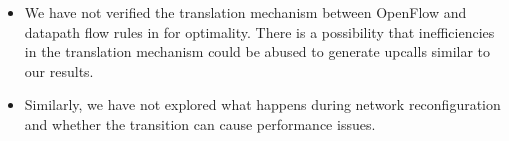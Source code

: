 \begin{itemize}
    \item We have not verified the translation mechanism between OpenFlow and datapath flow rules in  for optimality. There is a possibility that inefficiencies in the translation mechanism could be abused to generate upcalls similar to our results.

    \item Similarly, we have not explored what happens during network reconfiguration and whether the transition can cause performance issues.
\end{itemize}


